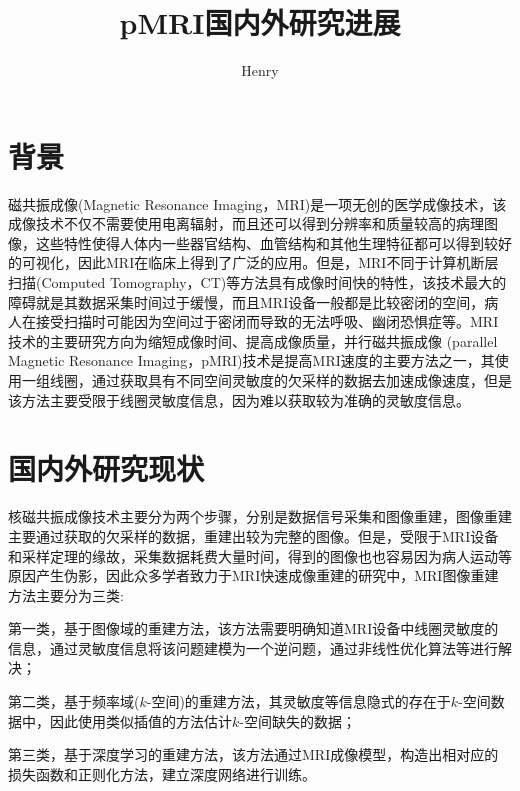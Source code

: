 \documentclass[UTF8]{article}
\begin{document}
\author{Henry}
\title{pMRI国内外研究进展}
\maketitle
\section{背景}
\par 磁共振成像(Magnetic Resonance Imaging，MRI)是一项无创的医学成像技术，该成像技术不仅不需要使用电离辐射，而且还可以得到分辨率和质量较高的病理图像，这些特性使得人体内一些器官结构、血管结构和其他生理特征都可以得到较好的可视化，因此MRI在临床上得到了广泛的应用。但是，MRI不同于计算机断层扫描(Computed Tomography，CT)等方法具有成像时间快的特性，该技术最大的障碍就是其数据采集时间过于缓慢，而且MRI设备一般都是比较密闭的空间，病人在接受扫描时可能因为空间过于密闭而导致的无法呼吸、幽闭恐惧症等。MRI技术的主要研究方向为缩短成像时间、提高成像质量，并行磁共振成像 \cite{deshmane2012parallel}(parallel Magnetic Resonance Imaging，pMRI)技术是提高MRI速度的主要方法之一，其使用一组线圈，通过获取具有不同空间灵敏度的欠采样的数据去加速成像速度，但是该方法主要受限于线圈灵敏度信息，因为难以获取较为准确的灵敏度信息。

\section{国内外研究现状}
\par 核磁共振成像技术主要分为两个步骤，分别是数据信号采集和图像重建，图像重建主要通过获取的欠采样的数据，重建出较为完整的图像。但是，受限于MRI设备和采样定理的缘故，采集数据耗费大量时间，得到的图像也也容易因为病人运动等原因产生伪影，因此众多学者致力于MRI快速成像重建的研究中，MRI图像重建方法主要分为三类:
\par 第一类，基于图像域的重建方法，该方法需要明确知道MRI设备中线圈灵敏度的信息，通过灵敏度信息将该问题建模为一个逆问题，通过非线性优化算法等进行解决；
\par 第二类，基于频率域($k$-空间)的重建方法，其灵敏度等信息隐式的存在于$k$-空间数据中，因此使用类似插值的方法估计$k$-空间缺失的数据；
\par 第三类，基于深度学习的重建方法，该方法通过MRI成像模型，构造出相对应的损失函数和正则化方法，建立深度网络进行训练。
\end{document}
